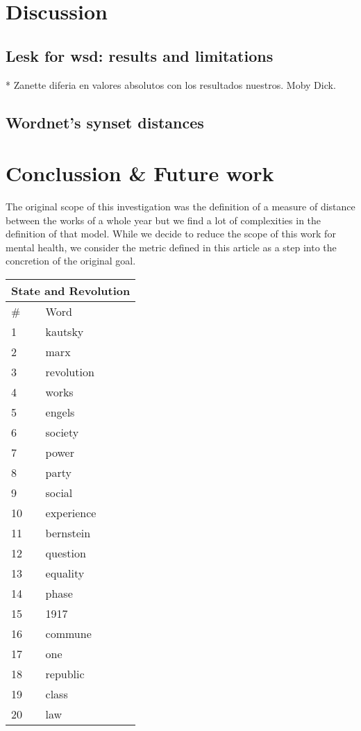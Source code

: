 \documentclass{pnastwo}
\begin{document}
\begin{article}
\section{Discussion}


\subsection{Lesk for wsd: results and limitations}
* Zanette diferia en valores absolutos con los resultados nuestros. Moby Dick. 

\subsection{Wordnet's synset distances}

\section{Conclussion \& Future work}
The original scope of this investigation was the definition of a measure of distance between the works of a whole year but we find a lot of complexities in the definition of that model. While we decide to reduce the scope of this work for mental health, we consider the metric defined in this article as a step into the concretion of the original goal.


\begin{center}
  \begin{tabular}{ | l | l | }
    \hline
    \multicolumn{2}{|c|}{State and Revolution} \\ \hline
    \# & Word  \\ \hline
1 & kautsky \\ \hline
2 & marx \\ \hline
3 & revolution \\ \hline
4 & works \\ \hline
5 & engels \\ \hline
6 & society \\ \hline
7 & power \\ \hline
8 & party \\ \hline
9 & social \\ \hline
10 & experience \\ \hline
11 & bernstein \\ \hline
12 & question \\ \hline
13 & equality \\ \hline
14 & phase \\ \hline
15 & 1917 \\ \hline
16 & commune \\ \hline
17 & one \\ \hline
18 & republic \\ \hline
19 & class \\ \hline
20 & law \\ \hline
  \end{tabular}
\end{center}


\end{article}
\end{document}

